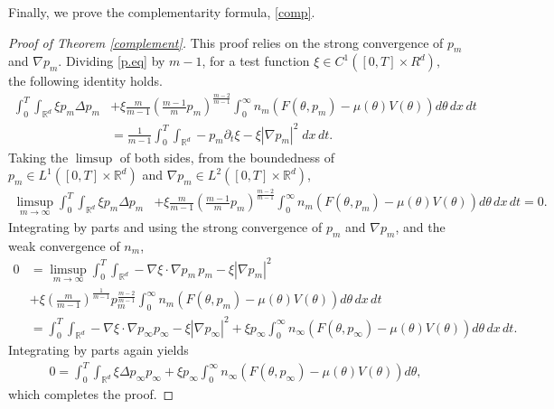 \documentclass{amsart}
\def\R{\mathbb R}
\begin{document}
Finally, we prove the complementarity formula, \eqref{comp}.
\begin{proof}[Proof of Theorem \ref{complement}]
This proof relies on the strong convergence of $p_m$ and $\nabla p_m$.
Dividing \eqref{p.eq} by $m-1$, for a test function $\xi \in C^1([0,T]\times R^d),$ the following identity holds.
\begin{align*}
\int_{0}^{T}\int_{\R^d}\xi p_m\Delta p_m &+\xi \frac{m}{m-1}(\frac{m-1}{m}p_m)^{\frac{m-2}{m-1}}\int_{0}^{\infty}n_m(F(\theta,p_m)-\mu(\theta)V(\theta))d\theta\,dx\,dt\\&=\frac{1}{m-1}\int_{0}^{T}\int_{\R^d} -p_m\partial_t \xi -\xi|\nabla p_m|^2\;dx\,dt.
\end{align*}
Taking the $\limsup$ of both sides, from the boundedness of $p_m \in L^1([0,T]\times \R^d)$ and $\nabla p_m \in L^2([0,T]\times \R^d)$,
\begin{align*}
\limsup_{m\rightarrow \infty}\int_{0}^{T}\int_{\R^d}\xi p_m\Delta p_m &+\xi \frac{m}{m-1}(\frac{m-1}{m}p_m)^{\frac{m-2}{m-1}}\int_{0}^{\infty}n_m(F(\theta,p_m)-\mu(\theta)V(\theta))d\theta\,dx\,dt=0.
\end{align*}
Integrating by parts and using the strong convergence of $p_m$ and $\nabla p_m$, and the weak convergence of $n_m$,
\begin{align*}
0&=\limsup_{m\rightarrow\infty}\int_{0}^{T}\int_{\R^d}-\nabla \xi \cdot \nabla p_m \,p_m-\xi |\nabla p_m|^2\\&+\xi(\frac{m}{m-1})^{\frac{1}{m-1}}p_m^{\frac{m-2}{m-1}}\int_{0}^{\infty}n_m(F(\theta,p_m)-\mu(\theta)V(\theta))d\theta\,dx\,dt\\
&=\int_{0}^{T}\int_{\R^d} -\nabla \xi \cdot \nabla p_\infty p_\infty - \xi |\nabla p_\infty|^2+\xi p_\infty \int_{0}^{\infty}n_\infty(F(\theta,p_\infty)-\mu(\theta)V(\theta))d\theta\, dx\, dt.
\end{align*}
 Integrating by parts again yields
\begin{align*}
     0=\int_{0}^{T}\int_{\R^d}\xi \Delta p_\infty p_\infty +\xi p_\infty \int_{0}^{\infty}n_\infty(F(\theta,p_\infty)-\mu(\theta)V(\theta))d\theta,
\end{align*}
 which completes the proof.
\end{proof}


\end{document}
